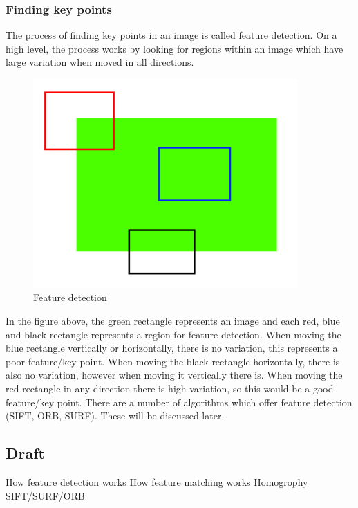 \documentclass[11pt,a4paper]{report}
\begin{document}
				\subsubsection{Finding key points}
					The process of finding key points in an image is called feature detection. On a high level, the process works by looking for regions within an image which have large variation when moved in all directions.
					
					\begin{figure}[h!]
						\centering
						\includegraphics[width=0.9\textwidth]{feature_detection}
						\caption{Feature detection}
					\end{figure}
					
					In the figure above, the green rectangle represents an image and each red, blue and black rectangle represents a region for feature detection. When moving the blue rectangle vertically or horizontally, there is no variation, this represents a poor feature/key point. When moving the black rectangle horizontally, there is also no variation, however when moving it vertically there is. When moving the red rectangle in any direction there is high variation, so this would be a good feature/key point. There are a number of algorithms which offer feature detection (SIFT, ORB, SURF). These will be discussed later.
				
			\newpage
			\subsection{Draft}
				How feature detection works
				How feature matching works
				Homogrophy
				SIFT/SURF/ORB
					
\end{document}
